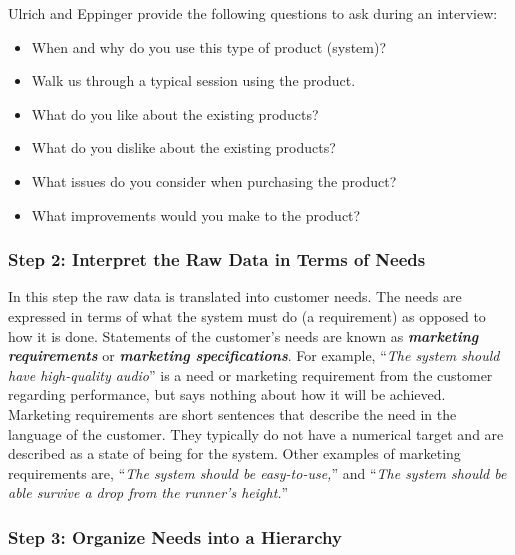 Ulrich and Eppinger provide the following questions to ask during an
interview:

\begin{itemize}
\item
  When and why do you use this type of product (system)?
\item
  Walk us through a typical session using the product.
\item
  What do you like about the existing products?
\item
  What do you dislike about the existing products?
\item
  What issues do you consider when purchasing the product?
\item
  What improvements would you make to the product?
\end{itemize}

\subsubsection*{Step 2: Interpret the Raw Data in Terms of
Needs}\label{step-2-interpret-the-raw-data-in-terms-of-needs}

In this step the raw data is translated into customer needs. The needs
are expressed in terms of what the system must do (a requirement) as
opposed to how it is done. Statements of the customer's needs are known
as \textbf{\emph{marketing requirements}} or \emph{\textbf{marketing
specifications}}. For example, ``\emph{The system should have
high-quality audio}'' is a need or marketing requirement from the
customer regarding performance, but says nothing about how it will be
achieved. Marketing requirements are short sentences that describe the
need in the language of the customer. They typically do not have a
numerical target and are described as a state of being for the system.
Other examples of marketing requirements are, ``\emph{The system should
be easy-to-use,}'' and ``\emph{The system should be able survive a drop
from the runner's height.}''

\subsubsection*{Step 3: Organize Needs into a
Hierarchy}\label{step-3-organize-needs-into-a-hierarchy}


